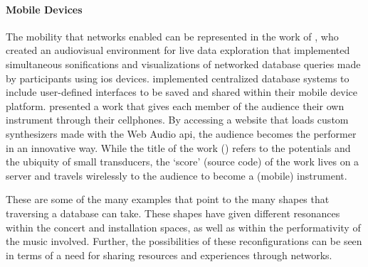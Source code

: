 {	\paragraph{Mobile Devices}
	The mobility that networks enabled can be represented in the work of 
	\textcite{Liu:2013}, who created an audiovisual environment for live data exploration that implemented simultaneous sonifications and visualizations of networked database queries made by participants using \gls{ios} devices. \textcite{btaylor:2014} implemented centralized database systems to include user-defined interfaces to be saved and shared within their mobile device platform. \textcite{Rya17:OnT} presented a work that gives each member of the audience their own instrument through their cellphones. By accessing a website that loads custom synthesizers made with the Web Audio \gls{api}, the audience becomes the performer in an innovative way. While the title of the work (\textcite{Rya17:OnT}) refers to the potentials and the ubiquity of small transducers, the `score' (source code) of the work lives on a server and travels wirelessly to the audience to become a (mobile) instrument.

	These are some of the many examples that point to the many shapes that traversing a database can take. These shapes have given different resonances within the concert and installation spaces, as well as within the performativity of the music involved. Further, the possibilities of these reconfigurations can be seen in terms of a need for sharing resources and experiences through networks.
}
